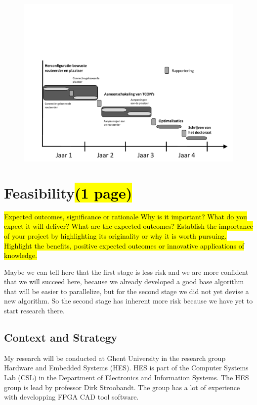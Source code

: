 \documentclass[a4paper,oneside,12pt]{article}
\begin{document}
\begin{figure}[ht]
\centering
\includegraphics[width = \textwidth,trim = 0mm 0mm 0mm 70mm, clip]{tijdschema.pdf}
\end{figure}

\newpage
\section{Feasibility\hl{(1 page)}}
\hl{Expected outcomes, significance or rationale
Why is it important? 
What do you expect it will deliver? 
What are the expected outcomes? 
Establish the importance of your project by highlighting its originality or why it is worth pursuing. Highlight the benefits, positive expected outcomes or innovative applications of knowledge.}

Maybe we can tell here that the first stage is less risk and we are more confident that we will succeed here, because we already developed a good base algorithm that will be easier to parallelize, but for the second stage we did not yet devise a new algorithm. So the second stage has inherent more risk because we have yet to start research there.


\subsection{Context and Strategy}\label{context}
My research will be conducted at Ghent University in the research group Hardware and Embedded Systems (HES). HES is part of the Computer Systems Lab (CSL) in the Department of Electronics and Information Systems. The HES group is lead by professor Dirk Stroobandt. The group has a lot of experience with developping FPGA CAD tool software.
\end{document}
